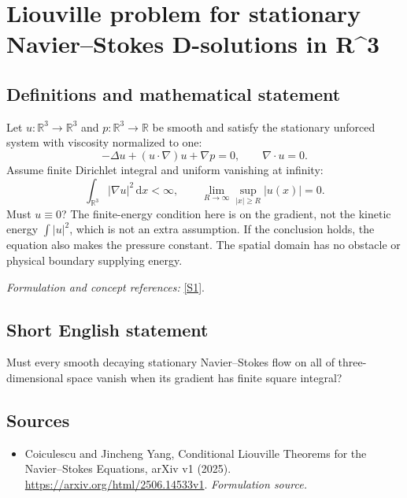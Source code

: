 \documentclass[11pt]{article}
\begin{document}
\section*{\texorpdfstring{Liouville problem for stationary Navier–Stokes D-solutions in R\textasciicircum{}3}{Liouville problem for stationary Navier–Stokes D-solutions in R\textasciicircum{}3}}\label{30006966}
\subsection{Definitions and mathematical statement}
Let $u:{\mathbb{R}}^3\to{\mathbb{R}}^3$ and $p:{\mathbb{R}}^3\to{\mathbb{R}}$ be smooth and satisfy the stationary unforced system with viscosity normalized to one:
\[
 -\Delta u+(u\cdot\nabla)u+\nabla p=0,
 \qquad\nabla\cdot u=0.
\]
Assume finite Dirichlet integral and uniform vanishing at infinity:
\[
 \int_{{\mathbb{R}}^3}|\nabla u|^2{\,\mathrm{d}} x<\infty,
 \qquad \lim_{R\to\infty}\sup_{|x|\ge R}|u(x)|=0.
\]
Must $u\equiv0$? The finite-energy condition here is on the gradient, not the kinetic energy $\int|u|^2$, which is not an extra assumption. If the conclusion holds, the equation also makes the pressure constant. The spatial domain has no obstacle or physical boundary supplying energy.
\par\smallskip\textit{Formulation and concept references:} \href{https://arxiv.org/html/2506.14533v1}{[S1]}.

\subsection{Short English statement}
Must every smooth decaying stationary Navier--Stokes flow on all of three-dimensional space vanish when its gradient has finite square integral?
\subsection{Sources}
\begin{itemize}
\item[S1]Coiculescu and Jincheng Yang, Conditional Liouville Theorems for the Navier–Stokes Equations, arXiv v1 (2025).
\url{https://arxiv.org/html/2506.14533v1}.
\textit{Formulation source.}
\end{itemize}
\end{document}
